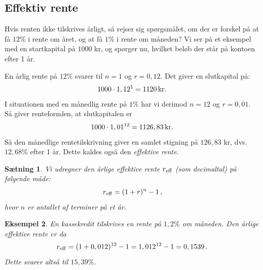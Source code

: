 \documentclass[12pt,oneside,a4paper]{article}
\newtheorem{thm}{Sætning}[section]
\newtheorem{eks}[thm]{Eksempel}
\begin{document}
\subsection{Effektiv rente}
Hvis renten ikke tilskrives årligt, så rejser sig spørgsmålet, om der er
forskel på at få $12\%$ i rente om året, og at få $1\%$ i rente om måneden?  Vi
ser på et eksempel med en startkapital på $1000$ kr, og spørger nu, hvilket
beløb der står på kontoen efter 1 år.

En årlig rente på $12\%$ svarer til $n=1$ og $r=0,12$. Det giver en slutkapital
på:
\[
    1000 \cdot 1,12^1 = 1120 {\,\rm kr.}
\]
I situationen med en månedlig rente på $1\%$ har vi derimod $n=12$ og $r=0,01$.
Så giver renteformlen, at slutkapitalen er
\[
    1000\cdot 1,01^{12} = 1126,83 {\,\rm kr.}
\]
Så den månedlige rentetilskrivning giver en samlet stigning på $126,83$ kr, dvs.
$12,68\%$ efter 1 år. Dette kaldes også den {\em effektive rente}.
\begin{tcolorbox}
\begin{thm}
    Vi udregner den årlige effektive rente $r_{\rm eff}$ (som decimaltal) på
    følgende måde:
    \[
        r_{\rm eff} = (1+r)^n-1\,,
    \]
hvor $n$ er antallet af terminer på et år.
\end{thm}
\end{tcolorbox}
\begin{tcolorbox}
\begin{eks}
    En kassekredit tilskrives en rente på $1,2\%$ om måneden. Den årlige
    effektive rente er da
    \[
        r_{\rm eff} = (1+0,012)^{12}-1 = 1,012^{12}-1 = 0,1539\,.
    \]
    Dette svarer altså til $15,39\%$.
\end{eks}
\end{tcolorbox}
\end{document}
